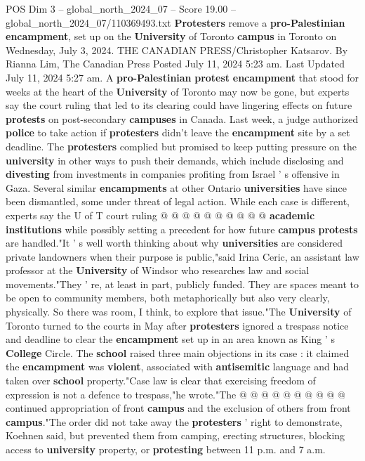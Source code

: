 \begin{textsample}{POS Dim 3 – global\_north\_2024\_07 – Score 19.00 – global\_north\_2024\_07/110369493.txt}  \label{ex:f3_pos_089}
\textbf{Protesters} remove a \textbf{pro-Palestinian} \textbf{encampment}, set up on the \textbf{University} of Toronto \textbf{campus} in Toronto on Wednesday, July 3, 2024.
THE CANADIAN PRESS/Christopher Katsarov.
By Rianna Lim, The Canadian Press Posted July 11, 2024 5:23 am.
Last Updated July 11, 2024 5:27 am.
A \textbf{pro-Palestinian} \textbf{protest} \textbf{encampment} that stood for weeks at the heart of the \textbf{University} of Toronto may now be gone, but experts say the court ruling that led to its clearing could have lingering effects on future \textbf{protests} on post-secondary \textbf{campuses} in Canada.
Last week, a judge authorized \textbf{police} to take action if \textbf{protesters} didn't leave the \textbf{encampment} site by a set deadline.
The \textbf{protesters} complied but promised to keep putting pressure on the \textbf{university} in other ways to push their demands, which include disclosing and \textbf{divesting} from investments in companies profiting from Israel ' s offensive in Gaza.
Several similar \textbf{encampments} at other Ontario \textbf{universities} have since been dismantled, some under threat of legal action.
While each case is different, experts say the U of T court ruling @ @ @ @ @ @ @ @ @ @ \textbf{academic} \textbf{institutions} while possibly setting a precedent for how future \textbf{campus} \textbf{protests} are handled."It ' s well worth thinking about why \textbf{universities} are considered private landowners when their purpose is public,"said Irina Ceric, an assistant law professor at the \textbf{University} of Windsor who researches law and social movements."They ' re, at least in part, publicly funded.
They are spaces meant to be open to community members, both metaphorically but also very clearly, physically.
So there was room, I think, to explore that issue."The \textbf{University} of Toronto turned to the courts in May after \textbf{protesters} ignored a trespass notice and deadline to clear the \textbf{encampment} set up in an area known as King ' s \textbf{College} Circle.
The \textbf{school} raised three main objections in its case : it claimed the \textbf{encampment} was \textbf{violent}, associated with \textbf{antisemitic} language and had taken over \textbf{school} property."Case law is clear that exercising freedom of expression is not a defence to trespass,"he wrote."The @ @ @ @ @ @ @ @ @ @ continued appropriation of front \textbf{campus} and the exclusion of others from front \textbf{campus}."The order did not take away the \textbf{protesters} ' right to demonstrate, Koehnen said, but prevented them from camping, erecting structures, blocking access to \textbf{university} property, or \textbf{protesting} between 11 p.m. and 7 a.m.

\end{textsample}
